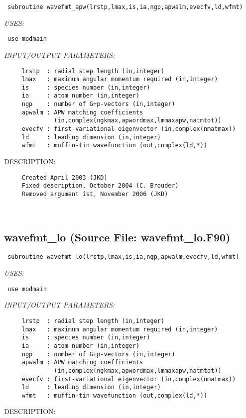 \documentclass[11pt]{article}
\begin{document}
\begin{verbatim} subroutine wavefmt_apw(lrstp,lmax,is,ia,ngp,apwalm,evecfv,ld,wfmt)\end{verbatim}{\em USES:}
\begin{verbatim} use modmain\end{verbatim}{\em INPUT/OUTPUT PARAMETERS:}
\begin{verbatim}     lrstp  : radial step length (in,integer)
     lmax   : maximum angular momentum required (in,integer)
     is     : species number (in,integer)
     ia     : atom number (in,integer)
     ngp    : number of G+p-vectors (in,integer)
     apwalm : APW matching coefficients
              (in,complex(ngkmax,apwordmax,lmmaxapw,natmtot))
     evecfv : first-variational eigenvector (in,complex(nmatmax))
     ld     : leading dimension (in,integer)
     wfmt   : muffin-tin wavefunction (out,complex(ld,*))\end{verbatim}
{\sf DESCRIPTION:\\ }


  
\begin{verbatim}     Created April 2003 (JKD)
     Fixed description, October 2004 (C. Brouder)
     Removed argument ist, November 2006 (JKD)\end{verbatim}


 
 
\mbox{}\hrulefill\ 
 
\subsection{wavefmt\_lo (Source File: wavefmt\_lo.F90)}


\begin{verbatim} subroutine wavefmt_lo(lrstp,lmax,is,ia,ngp,apwalm,evecfv,ld,wfmt)\end{verbatim}{\em USES:}
\begin{verbatim} use modmain\end{verbatim}{\em INPUT/OUTPUT PARAMETERS:}
\begin{verbatim}     lrstp  : radial step length (in,integer)
     lmax   : maximum angular momentum required (in,integer)
     is     : species number (in,integer)
     ia     : atom number (in,integer)
     ngp    : number of G+p-vectors (in,integer)
     apwalm : APW matching coefficients
              (in,complex(ngkmax,apwordmax,lmmaxapw,natmtot))
     evecfv : first-variational eigenvector (in,complex(nmatmax))
     ld     : leading dimension (in,integer)
     wfmt   : muffin-tin wavefunction (out,complex(ld,*))\end{verbatim}
{\sf DESCRIPTION:\\ }
\end{document}
